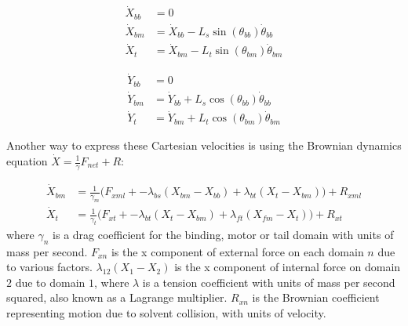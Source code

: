 \documentclass[9pt,twoside,lineno]{pnas-new}
\begin{document}
\noindent\begin{minipage}{0.49\linewidth}
\begin{align}
  \dot{X}_{bb} &= 0 \\
  \dot{X}_{bm} &= \dot{X}_{bb} - L_{s}\sin(\theta_{bb})\dot{\theta}_{bb} \label{cartesian-bmx}\\
  \dot{X}_{t } &= \dot{X}_{bm} - L_{t}\sin(\theta_{bm})\dot{\theta}_{bm}
\end{align}
\end{minipage}
\begin{minipage}{0.49\linewidth}
\begin{align}                                                                          
  \dot{Y}_{bb} &= 0 \\                                                        
  \dot{Y}_{bm} &= \dot{Y}_{bb} + L_{s}\cos(\theta_{bb})\dot{\theta}_{bb} \\
  \dot{Y}_{t}  &= \dot{Y}_{bm} + L_{t}\cos(\theta_{bm})\dot{\theta}_{bm}
\end{align}
\end{minipage}
\vspace{.5cm}

Another way to express these Cartesian velocities is using the Brownian dynamics equation $\dot{X} = \frac1\gamma F_{net} + R$:

\begin{align}  
  \dot{X}_{bm} &= \frac{1}{\gamma_m} \Big(F_{xml} + - \lambda_{bs}(X_{bm} - X_{bb}) + \lambda_{bt}(X_{t } - X_{bm}) \Big) + R_{xml} \label{brownian-bmx}\\
  \dot{X}_{t } &= \frac{1}{\gamma_t} \Big(F_{xt } + - \lambda_{bt}(X_{t } - X_{bm}) + \lambda_{ft}(X_{fm} - X_{t }) \Big) + R_{xt }
\end{align}
%
where $\gamma_n$ is a drag coefficient for the binding, motor or tail domain with units of mass per second. $F_{xn}$ is the x component of external force on each domain $n$ due to various factors. $\lambda_{12}\left(X_1 - X_2\right)$ is the x component of internal force on domain $2$ due to domain $1$, where $\lambda$ is a tension coefficient with units of mass per second squared, also known as a Lagrange multiplier. $R_{xn}$ is the Brownian coefficient representing motion due to solvent collision, with units of velocity.\\
\end{document}
